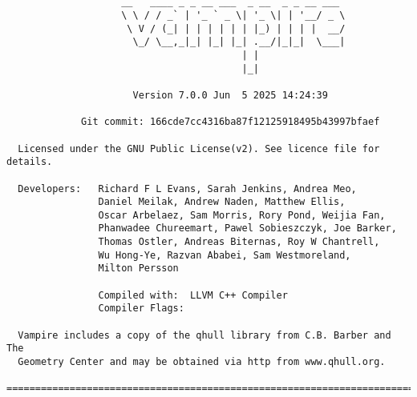 \noindent
\begin{minipage}[c]{\textwidth}
\begingroup
\fontsize{7.5}{7.5}\selectfont
\begin{verbatim}


                    __   ____ _ _ __ ___  _ __  _ _ __ ___
                    \ \ / / _` | '_ ` _ \| '_ \| | '__/ _ \
                     \ V / (_| | | | | | | |_) | | | |  __/
                      \_/ \__,_|_| |_| |_| .__/|_|_|  \___|
                                         | |
                                         |_|

                      Version 7.0.0 Jun  5 2025 14:24:39

             Git commit: 166cde7cc4316ba87f12125918495b43997bfaef

  Licensed under the GNU Public License(v2). See licence file for details.

  Developers:   Richard F L Evans, Sarah Jenkins, Andrea Meo,
                Daniel Meilak, Andrew Naden, Matthew Ellis,
                Oscar Arbelaez, Sam Morris, Rory Pond, Weijia Fan,
                Phanwadee Chureemart, Pawel Sobieszczyk, Joe Barker,
                Thomas Ostler, Andreas Biternas, Roy W Chantrell,
                Wu Hong-Ye, Razvan Ababei, Sam Westmoreland,
                Milton Persson

                Compiled with:  LLVM C++ Compiler
                Compiler Flags:

  Vampire includes a copy of the qhull library from C.B. Barber and The
  Geometry Center and may be obtained via http from www.qhull.org.

================================================================================

\end{verbatim}
\endgroup
\end{minipage}



